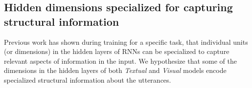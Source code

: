 %

\subsection{Hidden dimensions specialized for capturing structural information}
\label{sec:syntacticdim}

Previous work \cite{} has shown during training for a specific task, that individual units (or 
dimensions) in the hidden layers of RNNs can be specialized to capture relevant aspects of 
information in the input. We hypothesize that some of the dimensions in the hidden layers of 
both {\it Textual} and {\it Visual} models encode specialized structural information about the 
utterances. 


